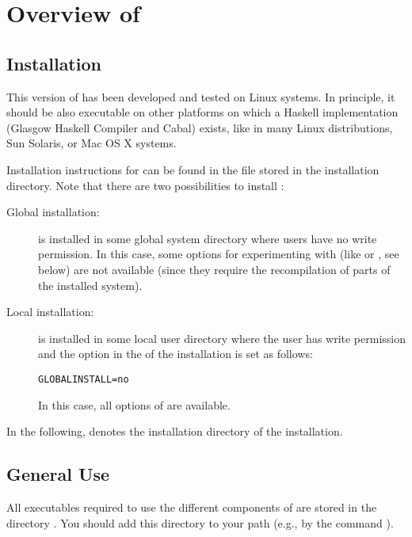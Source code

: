 \section{Overview of \CYS}

\subsection{Installation}
\label{sec-install}

This version of \CYS has been developed and
tested on Linux systems.
In principle, it should be also executable on other
platforms on which a Haskell implementation (Glasgow Haskell Compiler
and Cabal) exists, like in many Linux distributions, Sun Solaris,
or Mac OS X systems.

Installation instructions for \CYS can be found in
the file  stored in the \CYS installation directory.
Note that there are two possibilities to install \CYS:
\begin{description}
\item[Global installation:]
\CYS is installed in some global system directory where users
have no write permission. In this case, some options for experimenting
with \CYS (like  or , see below)
are not available (since they require the recompilation of parts of
the installed system).
\item[Local installation:]
\CYS is installed in some local user directory where the user
has write permission and the option 
in the  of the \CYS installation is set as follows:
\begin{lstlisting}
GLOBALINSTALL=no
\end{lstlisting}
In this case, all options of \CYS are available.
\end{description}
In the following, \cyshome denotes the installation directory
of the \CYS installation.


\subsection{General Use}
\label{sec-general}

All executables required to use the different components
of \CYS are stored in the directory .
You should add this directory
to your path (e.g., by the  command
).

